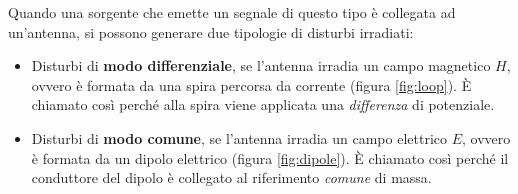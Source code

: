 \documentclass[11pt,4paper]{report}
\begin{document}
Quando una sorgente che emette un segnale di questo tipo è collegata ad un'antenna, si possono generare due tipologie di disturbi irradiati:
\begin{itemize}
\item Disturbi di \textbf{modo differenziale}, se l'antenna irradia un campo magnetico $H$, ovvero è formata da una spira percorsa da corrente (figura \ref{fig:loop}). È chiamato così perché alla spira viene applicata una \emph{differenza} di potenziale.
\item Disturbi di \textbf{modo comune}, se l'antenna irradia un campo elettrico $E$, ovvero è formata da un dipolo elettrico (figura \ref{fig:dipole}). È chiamato così perché il conduttore del dipolo è collegato al riferimento \emph{comune} di massa.
\end{itemize}
\end{document}
